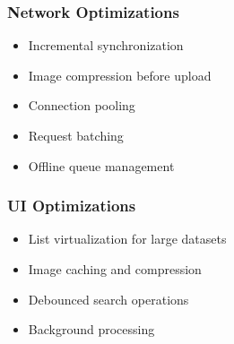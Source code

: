 \documentclass[12pt,a4paper]{article}
\begin{document}
\subsubsection{Network Optimizations}
\begin{itemize}[leftmargin=*, itemsep=0.2em]
    \item Incremental synchronization
    \item Image compression before upload
    \item Connection pooling
    \item Request batching
    \item Offline queue management
\end{itemize}

\subsubsection{UI Optimizations}
\begin{itemize}[leftmargin=*, itemsep=0.2em]
    \item List virtualization for large datasets
    \item Image caching and compression
    \item Debounced search operations
    \item Background processing
\end{itemize}

\newpage

\appendix
\end{document}
